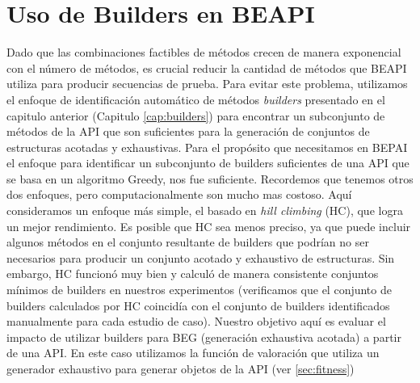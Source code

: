 \section{Uso de Builders en BEAPI}
\label{sec:builders}

Dado que las combinaciones factibles de métodos crecen de manera exponencial con el número de métodos, es crucial reducir la cantidad de métodos que \textsf{BEAPI} utiliza para producir secuencias de prueba. Para evitar este problema, utilizamos el enfoque de identificación automático de métodos \emph{builders} presentado en el capitulo anterior (Capitulo \ref{cap:builders}) para encontrar un subconjunto de métodos de la API que son suficientes para la generación de conjuntos de estructuras acotadas y exhaustivas. Para el propósito que necesitamos en \textsf{BEPAI} el enfoque  para identificar un subconjunto de builders suficientes de una API que se basa en un algoritmo Greedy, nos fue suficiente. Recordemos que tenemos otros dos enfoques, pero computacionalmente son mucho mas costoso. Aquí consideramos un enfoque más simple, el basado en \emph{hill climbing} (HC), que logra un mejor rendimiento. Es posible que HC sea menos preciso, ya que puede incluir algunos métodos en el conjunto resultante de builders que podrían no ser necesarios para producir un conjunto acotado y exhaustivo de estructuras. Sin embargo, HC funcionó muy bien y calculó de manera consistente conjuntos mínimos de builders en nuestros experimentos (verificamos que el conjunto de builders calculados por HC coincidía con el conjunto de builders identificados manualmente para cada estudio de caso). Nuestro objetivo aquí es evaluar el impacto de utilizar builders para BEG (generación exhaustiva acotada) a partir de una API. 
En este caso utilizamos la función de valoración que utiliza un generador exhaustivo para generar objetos de la API (ver \ref{sec:fitness})
